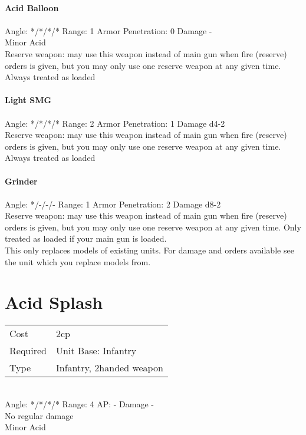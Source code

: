 \ \\
{\bf Acid Balloon } \\
\ \\
Angle: */*/*/* Range: 1 Armor Penetration: 0 Damage - \\
\indent Minor Acid\\Reserve weapon: may use this weapon instead of main gun when fire (reserve) orders is given, but you may only use one reserve weapon at any given time. Always treated as loaded \\



\ \\
{\bf Light SMG } \\
\ \\
Angle: */*/*/* Range: 2 Armor Penetration: 1 Damage d4-2 \\
\indent Reserve weapon: may use this weapon instead of main gun when fire (reserve) orders is given, but you may only use one reserve weapon at any given time. Always treated as loaded \\



\ \\
{\bf Grinder } \\
\ \\
Angle: */-/-/- Range: 1 Armor Penetration: 2 Damage d8-2 \\
\indent Reserve weapon: may use this weapon instead of main gun when fire (reserve) orders is given, but you may only use one reserve weapon at any given time. Only treated as loaded if your main gun is loaded. \\





This only replaces models of existing units. For damage and orders available see the unit which you replace models from.



\pagebreak\section{ Acid Splash }

\begin{tabular}{ll}
    Cost & 2cp \\
    Required & Unit Base: Infantry\\
    Type & Infantry, 2handed weapon\\
\end{tabular}
\ \\
\indent Angle: */*/*/* Range: 4  AP: - Damage - \\
No regular damage\\ Minor Acid
\ \\

